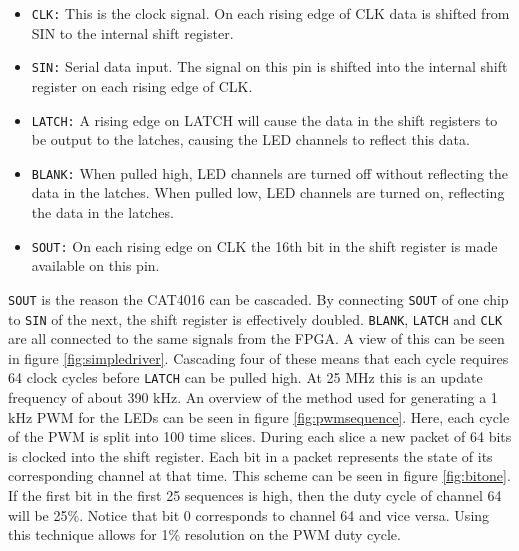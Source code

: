 \begin{itemize}
	\item \texttt{CLK:} This is the clock signal. On each rising edge of CLK data is shifted from SIN to the internal shift register.
	\item \texttt{SIN:} Serial data input. The signal on this pin is shifted into the internal shift register on each rising edge of CLK.
	\item \texttt{LATCH:} A rising edge on LATCH will cause the data in the shift registers to be output to the latches, causing the LED channels to reflect this data.
	\item \texttt{BLANK:} When pulled high, LED channels are turned off without reflecting the data in the latches. When pulled low, LED channels are turned on, reflecting the data in the latches.
	\item \texttt{SOUT:} On each rising edge on CLK the 16th bit in the shift register is made available on this pin.
\end{itemize}

\texttt{SOUT} is the reason the CAT4016 can be cascaded.
By connecting \texttt{SOUT} of one chip to \texttt{SIN} of the next, the shift register is effectively doubled.
\texttt{BLANK}, \texttt{LATCH} and \texttt{CLK} are all connected to the same signals from the FPGA.
A view of this can be seen in figure \ref{fig:simpledriver}.
Cascading four of these means that each cycle requires 64 clock cycles before \texttt{LATCH} can be pulled high.
At 25 MHz this is an update frequency of about 390 kHz.
An overview of the method used for generating a 1 kHz PWM for the LEDs can be seen in figure \ref{fig:pwmsequence}. 
Here, each cycle of the PWM is split into 100 time slices.
During each slice a new packet of 64 bits is clocked into the shift register.
Each bit in a packet represents the state of its corresponding channel at that time.
This scheme can be seen in figure \ref{fig:bitone}.
If the first bit in the first 25 sequences is high, then the duty cycle of channel 64 will be 25\%.
Notice that bit 0 corresponds to channel 64 and vice versa.
Using this technique allows for 1\% resolution on the PWM duty cycle.


